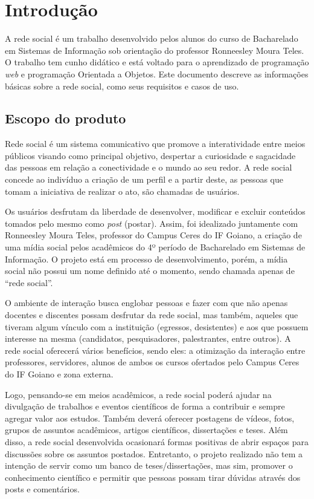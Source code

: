 \chapter{Introdução}

A rede social é um trabalho desenvolvido pelos alunos do curso de Bacharelado em Sistemas de Informação sob orientação do professor Ronneesley Moura Teles.
O trabalho tem cunho didático e está voltado para o aprendizado de programação \textit{web} e programação Orientada a Objetos.
Este documento descreve as informações básicas sobre a rede social, como seus requisitos e casos de uso.


\section{Escopo do produto}
Rede social é um sistema comunicativo que promove a interatividade entre meios públicos
visando como principal objetivo, despertar a curiosidade e sagacidade das pessoas em relação a
conectividade e o mundo ao seu redor. A rede social concede ao indivíduo a criação de um perfil e a
partir deste, as pessoas que tomam a iniciativa de realizar o ato, são chamadas de usuários.

Os usuários desfrutam da liberdade de desenvolver, modificar e excluir conteúdos tomados
pelo mesmo como \textit{post} (postar). Assim, foi idealizado juntamente com Ronneesley Moura Teles, professor do
Campus Ceres do IF Goiano, a criação de uma mídia social pelos acadêmicos do 4º período de
Bacharelado em Sistemas de Informação. O projeto está em processo de desenvolvimento, porém, a
mídia social não possui um nome definido até o momento, sendo chamada apenas de “rede social”.

O ambiente de interação busca englobar pessoas e fazer com que não apenas docentes e
discentes possam desfrutar da rede social, mas também, aqueles que tiveram algum vínculo com a
instituição (egressos, desistentes) e aos que possuem interesse na mesma (candidatos,
pesquisadores, palestrantes, entre outros). A rede social oferecerá vários benefícios, sendo eles: a
otimização da interação entre professores, servidores, alunos de ambos os cursos ofertados pelo
Campus Ceres do IF Goiano e zona externa.

Logo, pensando-se em meios acadêmicos, a rede social poderá ajudar na divulgação de trabalhos
e eventos científicos de forma a contribuir e sempre agregar valor aos estudos. Também deverá oferecer postagens de vídeos, fotos, grupos de assuntos acadêmicos, artigos
científicos, dissertações e teses. Além disso, a rede social desenvolvida ocasionará formas positivas de
abrir espaços para discussões sobre os assuntos postados. Entretanto, o projeto realizado não tem a
intenção de servir como um banco de teses/dissertações, mas sim, promover o conhecimento
científico e permitir que pessoas possam tirar dúvidas através dos posts e comentários.
  

